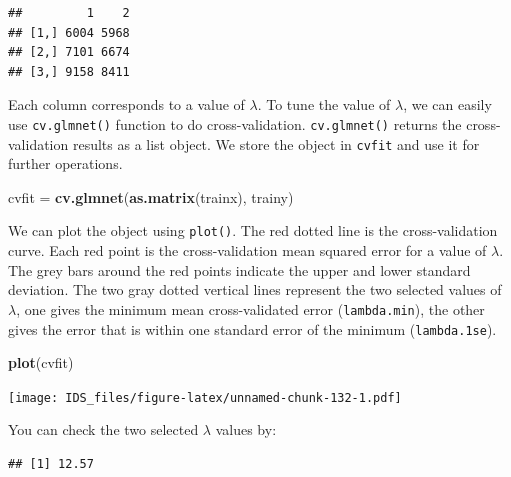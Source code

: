 \documentclass[12pt,]{krantz}
\makeatletter
\newenvironment{Shaded}{\begin{snugshade}}{\end{snugshade}}
\newcommand{\CommentTok}[1]{\textcolor[rgb]{0.37,0.37,0.37}{\textit{#1}}}
\newcommand{\FloatTok}[1]{\textcolor[rgb]{0.06,0.06,0.06}{#1}}
\newcommand{\KeywordTok}[1]{\textcolor[rgb]{0.27,0.27,0.27}{\textbf{#1}}}
\newcommand{\NormalTok}[1]{#1}
\newcommand{\OperatorTok}[1]{\textcolor[rgb]{0.43,0.43,0.43}{\textbf{#1}}}
\newcommand{\StringTok}[1]{\textcolor[rgb]{0.5,0.5,0.5}{#1}}
\newenvironment{kframe}{%
\medskip{}
\setlength{\fboxsep}{.8em}
 \def\at@end@of@kframe{}%
 \ifinner\ifhmode%
  \def\at@end@of@kframe{\end{minipage}}%
  \begin{minipage}{\columnwidth}%
 \fi\fi%
 \def\FrameCommand##1{\hskip\@totalleftmargin \hskip-\fboxsep
 \colorbox{shadecolor}{##1}\hskip-\fboxsep
     \hskip-\linewidth \hskip-\@totalleftmargin \hskip\columnwidth}%
 \MakeFramed {\advance\hsize-\width
   \@totalleftmargin\z@ \linewidth\hsize
   \@setminipage}}%
 {\par\unskip\endMakeFramed%
 \at@end@of@kframe}
\renewenvironment{Shaded}{\begin{kframe}}{\end{kframe}}
\makeatother
\begin{document}
\begin{verbatim}
##         1    2
## [1,] 6004 5968
## [2,] 7101 6674
## [3,] 9158 8411
\end{verbatim}

Each column corresponds to a value of \(\lambda\). To tune the value of \(\lambda\), we can easily use \texttt{cv.glmnet()} function to do cross-validation. \texttt{cv.glmnet()} returns the cross-validation results as a list object. We store the object in \texttt{cvfit} and use it for further operations.

\begin{Shaded}
\begin{Highlighting}[]
\NormalTok{cvfit =}\StringTok{ }\KeywordTok{cv.glmnet}\NormalTok{(}\KeywordTok{as.matrix}\NormalTok{(trainx), trainy)}
\end{Highlighting}
\end{Shaded}

We can plot the object using \texttt{plot()}. The red dotted line is the cross-validation curve. Each red point is the cross-validation mean squared error for a value of \(\lambda\). The grey bars around the red points indicate the upper and lower standard deviation. The two gray dotted vertical lines represent the two selected values of \(\lambda\), one gives the minimum mean cross-validated error (\texttt{lambda.min}), the other gives the error that is within one standard error of the minimum (\texttt{lambda.1se}).

\begin{Shaded}
\begin{Highlighting}[]
\KeywordTok{plot}\NormalTok{(cvfit)}
\end{Highlighting}
\end{Shaded}

\texttt{[image: IDS\_files/figure-latex/unnamed-chunk-132-1.pdf]}

You can check the two selected \(\lambda\) values by:

\begin{Shaded}
\end{Shaded}

\begin{verbatim}
## [1] 12.57
\end{verbatim}

\begin{Shaded}
\end{Shaded}
\end{document}
